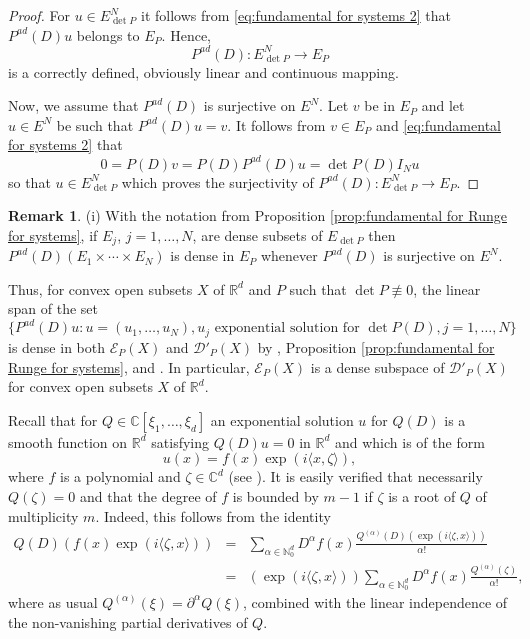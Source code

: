 \documentclass[a4paper,10pt]{amsart}
\newtheorem*{crucial lemma}{Lemma \ref{lem:nice polynomial2}}
\theoremstyle{definition}
\newtheorem{remark}[theorem]{Remark}
\newcommand{\R}{\mathbb{R}}
\newcommand{\C}{\mathbb{C}}
\newcommand{\N}{\mathbb{N}}
\newcommand{\Pad}{P^{ad}}
\newcommand{\detP}{\operatorname{det}\!P}
\begin{document}
\begin{proof}
	For $u\in E_{\detP}^N$ it follows from \eqref{eq:fundamental for systems 2} that $\Pad(D) u$ belongs to $E_P$. Hence,
	\[\Pad(D):E_{\detP}^N\rightarrow E_P\]
	is a correctly defined, obviously linear and continuous mapping.
	
	Now, we assume that $\Pad(D)$ is surjective on $E^N$. Let $v$ be in $E_P$ and let $u\in E^N$ be such that $\Pad(D)u=v$. It follows from $v\in E_P$ and \eqref{eq:fundamental for systems 2} that
	\[0=P(D)v=P(D)\Pad(D)u=\detP(D) I_N u\]
	so that $u\in E_{\detP}^N$ which proves the surjectivity of $\Pad(D):E_{\detP}^N\rightarrow E_P$.
\end{proof}

\begin{remark}\label{rem:dense subset}
	(i) With the notation from Proposition \ref{prop:fundamental for Runge for systems}, if $E_j$, $j=1,\ldots,N$, are dense subsets of $E_{\detP}$ then $\Pad(D)\left(E_1\times\cdots\times E_N\right)$ is dense in $E_P$ whenever $\Pad(D)$ is surjective on $E^N$.
	
	Thus, for convex open subsets $X$ of $\R^d$ and $P$ such that $\detP\not\equiv 0$, the linear span of the set
	\[\{\Pad(D)u \colon u=(u_1,\ldots,u_N), u_j\text{ exponential solution for }\detP(D), j=1,\ldots, N \}\]
	is dense in both $\mathscr{E}_P(X)$ and $\mathscr{D}'_P(X)$ by \cite[Chapitre Premiere, \S 2, Th\'eor\`eme 2]{Malgrange1955}, Proposition \ref{prop:fundamental for Runge for systems}, and \cite[Theorem 10.6.2, Corollary 10.6.8, Theorem 10.7.2, Corollary 10.7.10]{Hor2}. In particular, $\mathscr{E}_P(X)$ is a dense subspace of $\mathscr{D}'_P(X)$ for convex open subsets $X$ of $\R^d$. 
	
	Recall that for $Q\in\C[\xi_1,\ldots,\xi_d]$ an exponential solution $u$ for $Q(D)$ is a smooth function on $\R^d$ satisfying $Q(D)u=0$ in $\R^d$ and which is of the form
	\[u(x)=f(x)\exp(i\langle x,\zeta\rangle),\]
	where $f$ is a polynomial and $\zeta\in\C^d$ (see \cite[Definition 7.3.5]{Hor1}). It is easily verified that necessarily $Q(\zeta)=0$ and that the degree of $f$ is bounded by $m-1$ if $\zeta$ is a root of $Q$ of multiplicity $m$. Indeed, this follows from the identity
	\begin{eqnarray*}
		Q(D)\left(f(x)\exp\left(i\langle \zeta,x\rangle\right)\right)&=&\sum_{\alpha\in\N_0^d}D^\alpha f(x)\frac{Q^{(\alpha)}(D)\left(\exp(i\langle\zeta,x\rangle)\right)}{\alpha!}\\
		&=&\left(\exp(i\langle\zeta,x\rangle)\right) \sum_{\alpha\in\N_0^d}D^\alpha f(x)\frac{Q^{(\alpha)}(\zeta)}{\alpha!},
	\end{eqnarray*}
	where as usual $Q^{(\alpha)}(\xi)=\partial^\alpha Q(\xi)$, combined with the linear independence of the non-vanishing partial derivatives of $Q$.
	

\end{remark}
\end{document}
